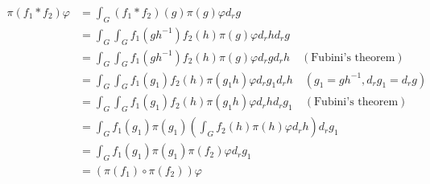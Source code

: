 \begin{problem}
\begin{align*}
    \pi(f_1 * f_2)\varphi &= \int_G (f_1 * f_2)(g) \pi(g) \varphi d_{r}g \\
    &= \int_G \int_G f_1(gh^{-1})f_{2}(h)\pi(g)\varphi d_{r}h d_{r}g \\
    &= \int_G \int_G f_1(gh^{-1})f_{2}(h)\pi(g)\varphi d_{r}g d_{r}h \quad (\text{Fubini's theorem}) \\
    &= \int_G \int_G f_{1}(g_{1})f_{2}(h)\pi(g_{1}h)\varphi d_{r}g_{1} d_{r}h\quad (g_1 = gh^{-1}, d_{r}g_1 = d_{r}g) \\
    &= \int_G \int_G f_{1}(g_{1})f_{2}(h)\pi(g_{1}h)\varphi d_{r}h d_{r}g_1\quad (\text{Fubini's theorem}) \\
    &= \int_G f_1(g_1) \pi(g_1) \left(\int_G f_2(h)\pi(h)\varphi d_{r}h \right)d_{r}g_{1} \\
    &= \int_G f_1(g_1) \pi(g_1) \pi(f_2)\varphi d_{r}g_1 \\
    &= (\pi(f_1) \circ \pi(f_2))\varphi
\end{align*}
\end{problem}
